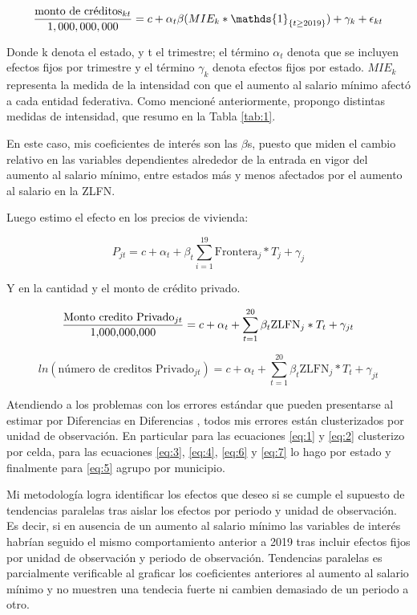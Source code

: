 \begin{equation}\label{eq:4}
{\textrm{monto de créditos}_{kt}\over 1,000,000,000}=c+\alpha_t\beta(MIE_k*\mathds{1}_{\{t\geq2019\}})+\gamma_k+\epsilon_{kt}
\end{equation}

Donde k denota el estado, y t el trimestre; el término $\alpha_t$ denota que se incluyen efectos fijos por trimestre y el término $\gamma_k$  denota efectos fijos por estado. $MIE_k$ representa la medida de la intensidad con que el aumento al salario mínimo afectó a cada entidad federativa. Como mencioné anteriormente, propongo distintas medidas de intensidad, que resumo en la Tabla \ref{tab:1}.

En este caso, mis coeficientes de interés son las  $\beta$s, puesto que miden el cambio relativo en las variables dependientes alrededor de la entrada en vigor del aumento al salario mínimo, entre estados más y menos afectados por el aumento al salario en la ZLFN.  

Luego estimo el efecto en los precios de vivienda:

\begin{equation} \label{eq:5}
P_{jt}=c+\alpha_t+\beta_t\sum_{i=1}^{19}\textrm{Frontera}_j * T_j +\gamma_j
\end{equation}

Y en la cantidad y el monto de crédito privado.

\begin{equation} \label{eq:6}
{\textrm{Monto credito Privado}_{jt}\over \textrm{1,000,000,000}}=c+\alpha_t+\sum_{t=1}^{20}\beta_t\textrm{ZLFN}_j * T_t +\gamma_{jt} 
\end{equation}

\begin{equation} \label{eq:7}
ln(\textrm{número de creditos Privado}_{jt})=c+\alpha_t+\sum_{t=1}^{20}\beta_t\textrm{ZLFN}_j * T_t +\gamma_{jt}
\end{equation}

Atendiendo a los problemas con los errores estándar que pueden presentarse al estimar por Diferencias en Diferencias \citep{bertrand_how_2004}, todos mis errores están clusterizados por unidad de observación. En particular para las ecuaciones \ref{eq:1} y \ref{eq:2} clusterizo por celda, para las ecuaciones \ref{eq:3}, \ref{eq:4}, \ref{eq:6} y \ref{eq:7} lo hago por estado y finalmente para \ref{eq:5} agrupo por municipio.

Mi metodología logra identificar los efectos que deseo si se cumple el supuesto de tendencias paralelas tras aislar los efectos por periodo y unidad de observación. Es decir, si en ausencia de un aumento al salario mínimo las variables de interés habrían seguido el mismo comportamiento anterior a 2019 tras incluir efectos fijos por unidad de observación y periodo de observación. Tendencias paralelas es parcialmente verificable al graficar los coeficientes anteriores al aumento al salario mínimo y no muestren una tendecia fuerte ni cambien demasiado de un periodo a otro.

